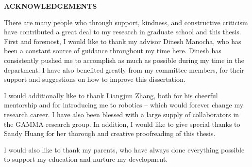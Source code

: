 \begin{center}
\vspace*{52pt}
{\Large \textbf{ACKNOWLEDGEMENTS}}
\end{center}

There are many people who through support, kindness, and constructive criticism have contributed a great deal to my research in graduate school and this thesis. First and foremost, I would like to thank my advisor Dinesh Manocha, who has been a constant source of guidance throughout my time here.  Dinesh has consistently pushed me to accomplish as much as possible during my time in the department. I have also benefited greatly from my committee members, for their support and suggestions on how to improve this dissertation.

I would additionally like to thank Liangjun Zhang, both for his cheerful mentorship and for introducing me to robotics -- which would forever change my research career. I have also been blessed with a large supply of collaborators in the GAMMA research group. In addition, I would like to give special thanks to Sandy Huang for her thorough and creative proofreading of this thesis.

I would also like to thank my parents, who have always done everything possible to support my education and nurture my development.
